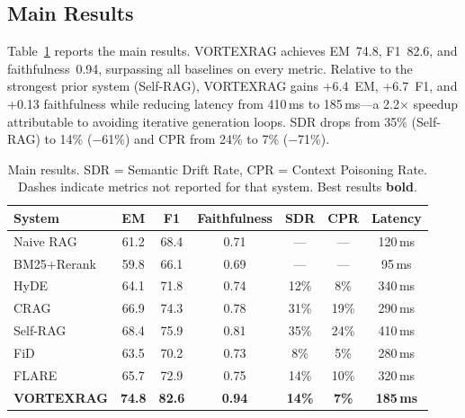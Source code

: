 \documentclass[10pt,twocolumn]{article}
\begin{document}
\subsection{Main Results}

Table~\ref{tab:main} reports the main results.  VORTEXRAG achieves EM~74.8,
F1~82.6, and faithfulness~0.94, surpassing all baselines on every metric.
Relative to the strongest prior system (Self-RAG), VORTEXRAG gains +6.4~EM,
+6.7~F1, and +0.13 faithfulness while reducing latency from 410\,ms to
185\,ms---a 2.2$\times$ speedup attributable to avoiding iterative generation
loops.  SDR drops from 35\% (Self-RAG) to 14\% ($-$61\%) and CPR from 24\%
to 7\% ($-$71\%).

\begin{table}[t]
\centering
\caption{Main results.  SDR = Semantic Drift Rate, CPR = Context Poisoning Rate.
Dashes indicate metrics not reported for that system.  Best results \textbf{bold}.}
\label{tab:main}
\small
\setlength{\tabcolsep}{5pt}
\begin{tabular}{@{}lcccccc@{}}
\toprule
\textbf{System} & \textbf{EM} & \textbf{F1} & \textbf{Faithfulness} & \textbf{SDR} & \textbf{CPR} & \textbf{Latency} \\
\midrule
Naive RAG            & 61.2 & 68.4 & 0.71 & ---  & ---  & 120\,ms \\
BM25+Rerank          & 59.8 & 66.1 & 0.69 & ---  & ---  & 95\,ms  \\
HyDE                 & 64.1 & 71.8 & 0.74 & 12\% & 8\%  & 340\,ms \\
CRAG                 & 66.9 & 74.3 & 0.78 & 31\% & 19\% & 290\,ms \\
Self-RAG             & 68.4 & 75.9 & 0.81 & 35\% & 24\% & 410\,ms \\
FiD                  & 63.5 & 70.2 & 0.73 & 8\%  & 5\%  & 280\,ms \\
FLARE                & 65.7 & 72.9 & 0.75 & 14\% & 10\% & 320\,ms \\
\midrule
\textbf{VORTEXRAG}   & \textbf{74.8} & \textbf{82.6} & \textbf{0.94} &
                       \textbf{14\%} & \textbf{7\%} & \textbf{185\,ms} \\
\bottomrule
\end{tabular}
\end{table}
\end{document}
